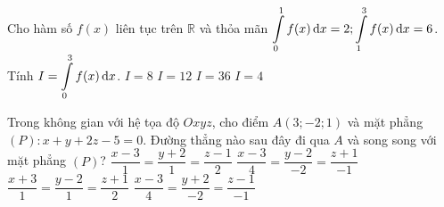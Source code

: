 \begin{ex}%
	Cho hàm số $f(x)$ liên tục trên $\mathbb{R}$ và thỏa mãn $\displaystyle\displaystyle\int\limits_{0}^{1}f(x) \mathrm{\,d}x=2; \displaystyle\displaystyle\int\limits_{1}^{3}f(x) \mathrm{\,d}x=6$. Tính $I=\displaystyle\displaystyle\int\limits_{0}^{3}f(x) \mathrm{\,d}x$.
	\choice
	{\True $I=8$}
	{$I=12$}
	{$I=36$}
	{$I=4$}
\end{ex}

\begin{ex}%
	Trong không gian với hệ tọa độ $Oxyz$, cho điểm $A(3;-2;1)$ và mặt phẳng $(P)\colon x+y+2z-5=0$. Đường thẳng nào sau đây đi qua $A$ và song song với mặt phẳng $(P)$?
	\choice
	{$\dfrac{x-3}{1}=\dfrac{y+2}{1} =\dfrac{z-1}{2}$}
	{$\dfrac{x-3}{4}=\dfrac{y-2}{-2} =\dfrac{z+1}{-1}$}
	{$\dfrac{x+3}{1}=\dfrac{y-2}{1} =\dfrac{z+1}{2}$}
	{\True $\dfrac{x-3}{4}=\dfrac{y+2}{-2} =\dfrac{z-1}{-1}$}
\end{ex}

